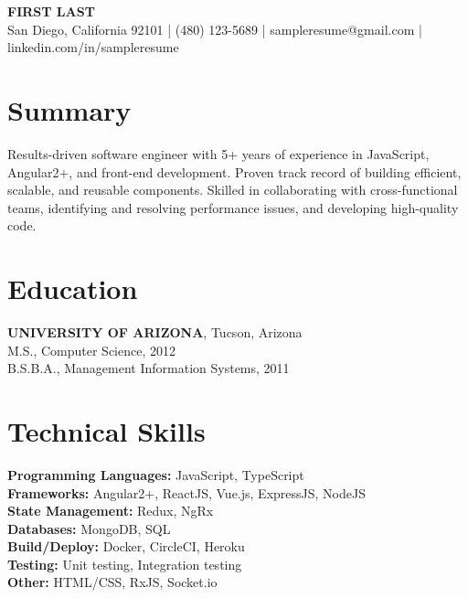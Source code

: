 \documentclass[10pt, letterpaper]{article}
\newenvironment{header}{
 \setlength{\topsep}{0pt}\par\kern\topsep\centering\linespread{1.5}
}{
 \par\kern\topsep
} %
\begin{document}
 \newcommand{\AND}{\unskip
 \cleaders\copy\ANDbox\hskip\wd\ANDbox
 \ignorespaces
 }
 \newsavebox\ANDbox
 \sbox\ANDbox{$|$}

 \begin{header}
 \textbf{FIRST LAST} \\
 San Diego, California 92101 | (480) 123-5689 | sampleresume@gmail.com | linkedin.com/in/sampleresume
\end{header}

 \section*{Summary}
Results-driven software engineer with 5+ years of experience in JavaScript, Angular2+, and front-end development. Proven track record of building efficient, scalable, and reusable components. Skilled in collaborating with cross-functional teams, identifying and resolving performance issues, and developing high-quality code.

 \section*{Education}
 \textbf{UNIVERSITY OF ARIZONA}, Tucson, Arizona \\
 M.S., Computer Science, 2012 \\
 B.S.B.A., Management Information Systems, 2011

 \section*{Technical Skills}
 \textbf{Programming Languages:} JavaScript, TypeScript \\
 \textbf{Frameworks:} Angular2+, ReactJS, Vue.js, ExpressJS, NodeJS \\
 \textbf{State Management:} Redux, NgRx \\
 \textbf{Databases:} MongoDB, SQL \\
 \textbf{Build/Deploy:} Docker, CircleCI, Heroku \\
 \textbf{Testing:} Unit testing, Integration testing \\
 \textbf{Other:} HTML/CSS, RxJS, Socket.io
\end{document}
